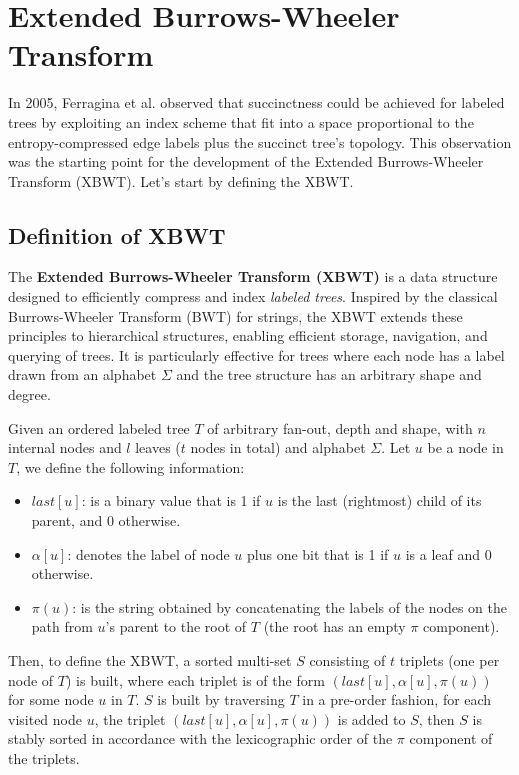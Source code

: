 \section{Extended Burrows-Wheeler Transform}

In 2005, Ferragina et al. \cite{ferragina2009compressing} observed that succinctness could be achieved for labeled trees by exploiting an index scheme that fit into a space proportional to the entropy-compressed edge labels plus the succinct tree's topology. This observation was the starting point for the development of the Extended Burrows-Wheeler Transform (XBWT). Let's start by defining the XBWT.

\subsection{Definition of XBWT}
The \textbf{Extended Burrows-Wheeler Transform (XBWT)} is a data structure designed to efficiently compress and index \emph{labeled trees}. Inspired by the classical Burrows-Wheeler Transform (BWT) \cite{burrows1994block} for strings, the XBWT extends these principles to hierarchical structures, enabling efficient storage, navigation, and querying of trees. It is particularly effective for trees where each node has a label drawn from an alphabet $\Sigma$ and the tree structure has an arbitrary shape and degree.

Given an ordered labeled tree $T$ of arbitrary fan-out, depth and shape, with $n$ internal nodes and $l$ leaves ($t$ nodes in total) and alphabet $\Sigma$. Let $u$ be a node in $T$, we define the following information:
\begin{itemize}
    \item $last[u]$: is a binary value that is 1 if $u$ is the last (rightmost) child of its parent, and 0 otherwise.
    \item $\alpha[u]$: denotes the label of node $u$ plus one bit that is 1 if $u$ is a leaf and 0 otherwise.
    \item $\pi(u)$: is the string obtained by concatenating the labels of the nodes on the path from $u$'s parent to the root of $T$ (the root has an empty $\pi$ component).
\end{itemize}

Then, to define the XBWT, a sorted multi-set $S$ consisting of $t$ triplets (one per node of $T$) is built, where each triplet is of the form $(last[u], \alpha[u], \pi(u))$ for some node $u$ in $T$. $S$ is built by traversing $T$ in a pre-order fashion, for each visited node $u$, the triplet $(last[u], \alpha[u], \pi(u))$ is added to $S$, then $S$ is stably sorted in accordance with the lexicographic order of the $\pi$ component of the triplets.

